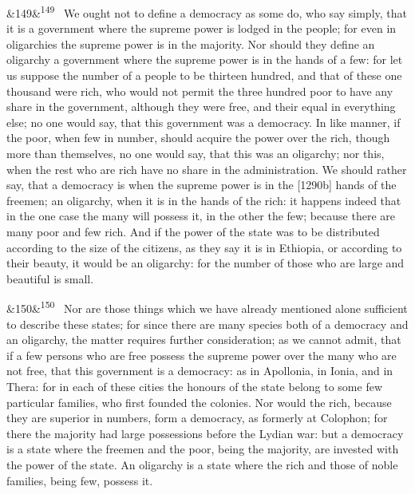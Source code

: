 \documentclass[12pt]{article}
\newcommand{\para}[1][]{\par\noindent\ifx&#1&\else\textsuperscript{\footnotesize #1}~\fi}
\begin{document}
\para[149] We ought not to define a democracy as some do, who say simply, that it is a government where the supreme power is lodged in the people; for even in oligarchies the supreme power is in the majority. Nor should they define an oligarchy a government where the supreme power is in the hands of a few: for let us suppose the number of a people to be thirteen hundred, and that of these one thousand were rich, who would not permit the three hundred poor to have any share in the government, although they were free, and their equal in everything else; no one would say, that this government was a democracy. In like manner, if the poor, when few in number, should acquire the power over the rich, though more than themselves, no one would say, that this was an oligarchy; nor this, when the rest who are rich have no share in the administration. We should rather say, that a democracy is when the supreme power is in the [1290b] hands of the freemen; an oligarchy, when it is in the hands of the rich: it happens indeed that in the one case the many will possess it, in the other the few; because there are many poor and few rich. And if the power of the state was to be distributed according to the size of the citizens, as they say it is in Ethiopia, or according to their beauty, it would be an oligarchy: for the number of those who are large and beautiful is small.

\para[150] Nor are those things which we have already mentioned alone sufficient to describe these states; for since there are many species both of a democracy and an oligarchy, the matter requires further consideration; as we cannot admit, that if a few persons who are free possess the supreme power over the many who are not free, that this government is a democracy: as in Apollonia, in Ionia, and in Thera: for in each of these cities the honours of the state belong to some few particular families, who first founded the colonies. Nor would the rich, because they are superior in numbers, form a democracy, as formerly at Colophon; for there the majority had large possessions before the Lydian war: but a democracy is a state where the freemen and the poor, being the majority, are invested with the power of the state. An oligarchy is a state where the rich and those of noble families, being few, possess it.
\end{document}
